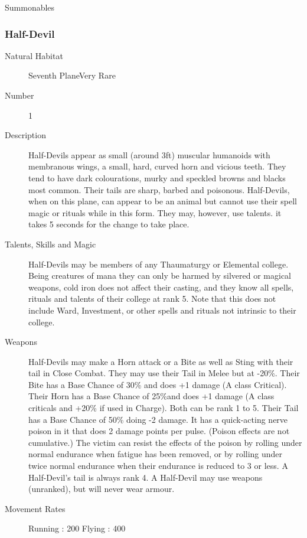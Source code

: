 \begin{mmgroup}{Summonables}
\begin{mmcomment}
\end{mmcomment}

\subsubsection{Half-Devil}

\begin{description}
\item[Natural Habitat]Seventh PlaneVery Rare

\item[Number] 1

\item[Description]Half-Devils appear as small (around 3ft) muscular humanoids with
membranous wings, a small, hard, curved horn and vicious teeth.  They
tend to have dark colourations, murky and speckled browns and blacks
most common.  Their tails are sharp, barbed and poisonous.
Half-Devils, when on this plane, can appear to be an animal but cannot
use their spell magic or rituals while in this form.  They may,
however, use talents.  it takes 5 seconds for the change to take
place.

\item[Talents, Skills and Magic]Half-Devils may be members of any Thaumaturgy or Elemental
college.  Being creatures of mana they can only be harmed by silvered
or magical weapons, cold iron does not affect their casting, and they
know all spells, rituals and talents of their college at rank 5.  Note
that this does not include Ward, Investment, or other spells and
rituals not intrinsic to their college.

\item[Weapons]Half-Devils may make a Horn attack or a Bite as well as Sting with
their tail in Close Combat.  They may use their Tail in Melee but at
-20\%.  Their Bite has a Base Chance of 30\% and does +1
damage (A class Critical).  Their Horn has a Base Chance of 25\%and does +1 damage (A class criticals and +20\% if used in
Charge).  Both can be rank 1 to 5. Their Tail has a Base Chance of
50\% doing -2 damage. It has a quick-acting nerve poison in it
that does 2 damage points per pulse. (Poison effects are not
cumulative.)  The victim can resist the effects of the poison by
rolling under normal endurance when fatigue has been removed, or by
rolling under twice normal endurance when their endurance is reduced
to 3 or less.  A Half-Devil's tail is always rank 4.  A Half-Devil may
use weapons (unranked), but will never wear armour.


\item[Movement Rates] Running : 200  Flying : 400


\end{description}
\end{mmgroup}
